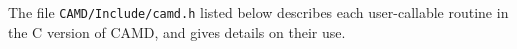 \documentclass[11pt]{article}
\begin{document}
The file {\tt CAMD/Include/camd.h} listed below
describes each user-callable routine in the C version of CAMD,
and gives details on their use.

{\footnotesize

}


\newpage



\end{document}

